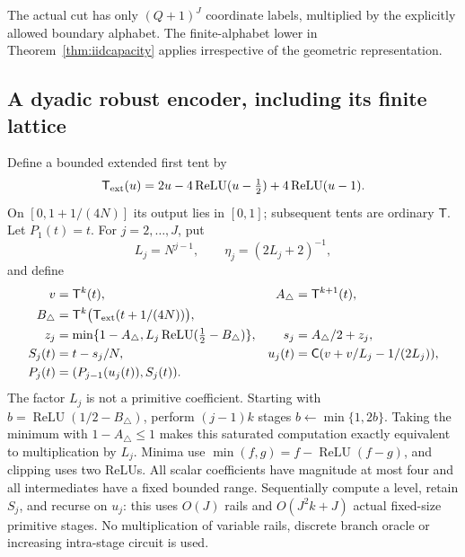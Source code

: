 \documentclass[11pt,letterpaper]{article}
\theoremstyle{definition}\newtheorem{definition}[theorem]{Definition}
\theoremstyle{remark}\newtheorem{remark}[theorem]{Remark}
\begin{document}
The actual cut has only $(Q+1)^J$ coordinate labels, multiplied by the explicitly allowed boundary alphabet. The finite-alphabet lower in Theorem~\ref{thm:iidcapacity} applies irrespective of the geometric representation.

\subsection{A dyadic robust encoder, including its finite lattice}
Define a bounded extended first tent by
\[
 \mathsf T_{\rm ext}(u)=2u-4\operatorname{ReLU}(u-\tfrac12)
                         +4\operatorname{ReLU}(u-1).
\]
On $[0,1+1/(4N)]$ its output lies in $[0,1]$; subsequent tents are ordinary $\mathsf T$. Let $P_1(t)=t$. For $j=2,\ldots,J$, put
\[
 L_j=N^{j-1},\qquad \eta_j=(2L_j+2)^{-1},
\]
and define
\begin{equation}\label{eq:dyadicsnake}
 \begin{aligned}
 v&=\mathsf T^k(t),& A_\triangle&=\mathsf T^{k+1}(t),\\
 B_\triangle&=\mathsf T^k\bigl(\mathsf T_{\rm ext}(t+1/(4N))\bigr),\\
 z_j&=\min\{1-A_\triangle,L_j\operatorname{ReLU}(\tfrac12-B_\triangle)\},&
 s_j&=A_\triangle/2+z_j,\\
 S_j(t)&=t-s_j/N,&
 u_j(t)&=\mathsf C(v+v/L_j-1/(2L_j)),\\
 P_j(t)&=(P_{j-1}(u_j(t)),S_j(t)).
 \end{aligned}
\end{equation}
The factor $L_j$ is not a primitive coefficient. Starting with $b=\operatorname{ReLU}(1/2-B_\triangle)$, perform $(j-1)k$ stages $b\leftarrow\min\{1,2b\}$. Taking the minimum with $1-A_\triangle\le1$ makes this saturated computation exactly equivalent to multiplication by $L_j$. Minima use $\min(f,g)=f-\operatorname{ReLU}(f-g)$, and clipping uses two ReLUs. All scalar coefficients have magnitude at most four and all intermediates have a fixed bounded range. Sequentially compute a level, retain $S_j$, and recurse on $u_j$: this uses $O(J)$ rails and $O(J^2k+J)$ actual fixed-size primitive stages. No multiplication of variable rails, discrete branch oracle or increasing intra-stage circuit is used.
\end{document}
